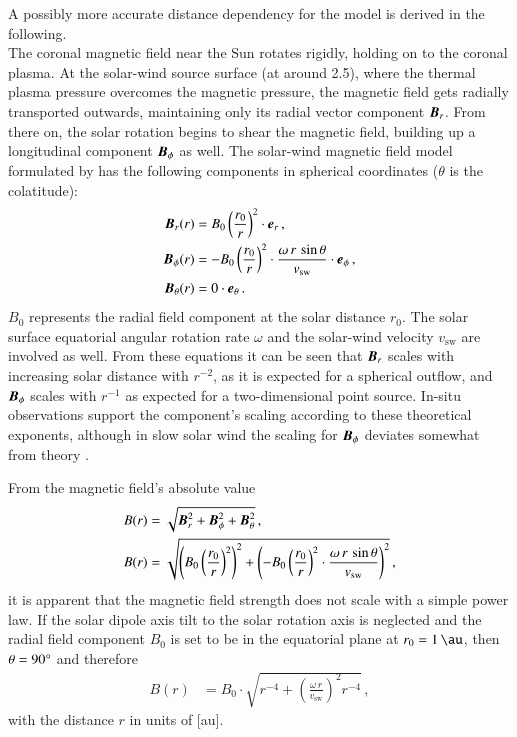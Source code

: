 A possibly more accurate distance dependency for the model is derived in the following.\\

The coronal magnetic field near the Sun rotates rigidly, holding on to the coronal plasma. At the solar-wind source surface (at around \SI{2.5}{\Rs}), where the thermal plasma pressure overcomes the magnetic pressure, the magnetic field gets radially transported outwards, maintaining only its radial vector component $\boldsymbol{B}_r$. From there on, the solar rotation begins to shear the magnetic field, building up a longitudinal component $\boldsymbol{B}_\phi$ as well. The solar-wind magnetic field model formulated by \citet{Parker1958} has the following components in spherical coordinates ($\theta$ is the colatitude):
\begin{align}
	\boldsymbol{B}_r(r) &= B_0 \left(\frac{r_0}{r}\right)^2 \cdot \boldsymbol{e}_r\,,\\
	\boldsymbol{B}_\phi(r) &= -B_0 \left(\frac{r_0}{r}\right)^2 \cdot \frac{\omega\,r\,\sin\theta}{v_\text{sw}} \cdot \boldsymbol{e}_\phi	\,,	\label{eq:b_phi_vector}\\
	\boldsymbol{B}_\theta(r) &= 0 \cdot \boldsymbol{e}_\theta\,.
\end{align}
$B_0$ represents the radial field component at the solar distance $r_0$. The solar surface equatorial angular rotation rate $\omega$ and the solar-wind velocity $v_\text{sw}$ are involved as well. From these equations it can be seen that $\boldsymbol{B}_r$ scales with increasing solar distance with $r^{-2}$, as it is expected for a spherical outflow, and $\boldsymbol{B}_\phi$ scales with $r^{-1}$ as expected for a two-dimensional point source. In-situ observations support the component's scaling according to these theoretical exponents, although in slow solar wind the scaling for $\boldsymbol{B}_\phi$ deviates somewhat from theory \citep{Mariani1978}.

From the magnetic field's absolute value
\begin{align}
	B(r) &= \sqrt{\boldsymbol{B}_r^2 + \boldsymbol{B}_\phi^2 + \boldsymbol{B}_\theta^2}\,,	\label{eq:B_absolute}\\
	B(r) &= \sqrt{\left(B_0 \left(\frac{r_0}{r}\right)^2\right)^2 + \left(-B_0 \left(\frac{r_0}{r}\right)^2 \cdot \frac{\omega\,r\,\sin\theta}{v_\text{sw}}\right)^2}\,,
\end{align}
it is apparent that the magnetic field strength does not scale with a simple power law. If the solar dipole axis tilt to the solar rotation axis is neglected and the radial field component $B_0$ is set to be in the equatorial plane at $r_0 = \SI{1}{\au}$, then $\theta = 90\degree$ and therefore
\begin{align}
	B(r) &= B_0 \cdot \sqrt{r^{-4} + \left(\frac{\omega\,r}{v_\text{sw}}\right)^2 r^{-4}}\,,	\label{eq:B_1au}
\end{align}
with the distance $r$ in units of [au].

